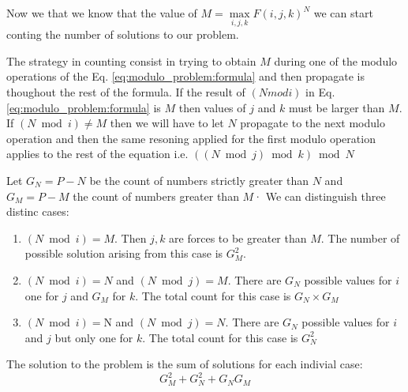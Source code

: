 Now we that we know that the value of $M = \max\limits_{i,j,k}F(i,j,k)^N$ we can start conting the number of solutions to our problem.


The strategy in counting consist in trying to obtain $M$ during one of the modulo operations of the Eq. \ref{eq:modulo_problem:formula} and then propagate is thoughout the rest of the formula. If the result of $(N mod i) $ in Eq. \ref{eq:modulo_problem:formula} is $M$ then values of $j$ and $k$ must be larger than $M$. If $(N \bmod i) \neq M$ then we will have to let $N$ propagate to the next modulo operation and then the same resoning applied for the first modulo operation applies to the rest of the equation i.e. $( ( N \bmod{j} ) \bmod{k}) \bmod{N}$

Let $G_N= P-N$ be the count of numbers strictly greater than $N$ and  $G_M= P-M$ the count of numbers greater than $M$·
We can distinguish three distinc cases:
\begin{enumerate}
	\item $(N \bmod i)=M$. Then $j,k$ are forces to be greater than $M$. The number of possible solution arising from this case is $G_M^2$.
	\item $(N \bmod i)=N$ and  $(N \bmod j)=M$. There are $G_N$ possible values for $i$ one for $j$ and $G_M$ for $k$. The total count for this case is $G_N \times G_M$
	\item $(N \bmod i)=$N and  $(N \bmod j)=N$. There are $G_N$ possible values for $i$ and $j$ but only one for $k$. The total count for this case is $G_N^2$
\end{enumerate}

The solution to the problem is the sum of solutions for each indivial case: 
\begin{equation}
	\label{eq:modulo_problem:solution}
	G_M^2 + G_N^2 + G_N G_M 
\end{equation}


